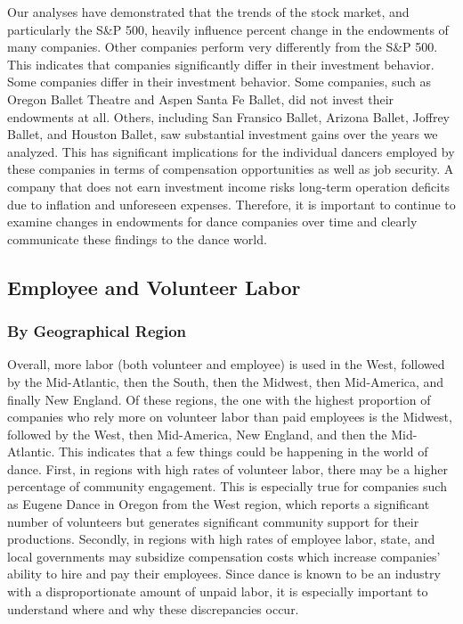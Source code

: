\documentclass[Dance Data
Project,article,submit,moreauthors,pdftex]{mdpi}
\begin{document}
Our analyses have demonstrated that the trends of the stock market, and
particularly the S\&P 500, heavily influence percent change in the
endowments of many companies. Other companies perform very differently
from the S\&P 500. This indicates that companies significantly differ in
their investment behavior. Some companies differ in their investment
behavior. Some companies, such as Oregon Ballet Theatre and Aspen Santa
Fe Ballet, did not invest their endowments at all. Others, including San
Fransico Ballet, Arizona Ballet, Joffrey Ballet, and Houston Ballet, saw
substantial investment gains over the years we analyzed. This has
significant implications for the individual dancers employed by these
companies in terms of compensation opportunities as well as job
security. A company that does not earn investment income risks long-term
operation deficits due to inflation and unforeseen expenses. Therefore,
it is important to continue to examine changes in endowments for dance
companies over time and clearly communicate these findings to the dance
world.

\hypertarget{employee-and-volunteer-labor}{%
\subsection{Employee and Volunteer
Labor}\label{employee-and-volunteer-labor}}

\hypertarget{by-geographical-region}{%
\subsubsection{By Geographical Region}\label{by-geographical-region}}

Overall, more labor (both volunteer and employee) is used in the West,
followed by the Mid-Atlantic, then the South, then the Midwest, then
Mid-America, and finally New England. Of these regions, the one with the
highest proportion of companies who rely more on volunteer labor than
paid employees is the Midwest, followed by the West, then Mid-America,
New England, and then the Mid-Atlantic. This indicates that a few things
could be happening in the world of dance. First, in regions with high
rates of volunteer labor, there may be a higher percentage of community
engagement. This is especially true for companies such as Eugene Dance
in Oregon from the West region, which reports a significant number of
volunteers but generates significant community support for their
productions. Secondly, in regions with high rates of employee labor,
state, and local governments may subsidize compensation costs which
increase companies' ability to hire and pay their employees. Since dance
is known to be an industry with a disproportionate amount of unpaid
labor, it is especially important to understand where and why these
discrepancies occur.
\end{document}
